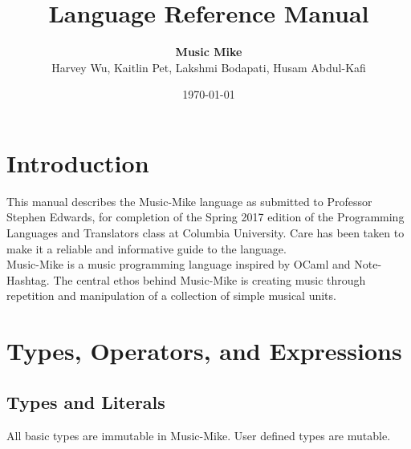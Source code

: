 \documentclass[12pt]{report}
\title{Language Reference Manual}
\author{\textbf{Music Mike} \\ Harvey Wu, Kaitlin Pet, Lakshmi Bodapati, Husam Abdul-Kafi}
\date{\today}
\begin{document}
\maketitle




\newpage

\tableofcontents{}
\newpage



\chapter{Introduction}
 
This manual describes the Music-Mike language as submitted to Professor Stephen Edwards, for completion of the Spring 2017 edition of the Programming Languages and Translators class at Columbia University. Care has been taken to make it a reliable and informative guide to the language. \\

Music-Mike is a music programming language inspired by OCaml and Note-Hashtag. The central ethos behind Music-Mike is creating music through repetition and manipulation of a collection of simple musical units. 


 
\chapter{Types, Operators, and Expressions}
\section{Types and Literals}
All basic types are immutable in Music-Mike. User defined types are mutable. 
\end{document}
